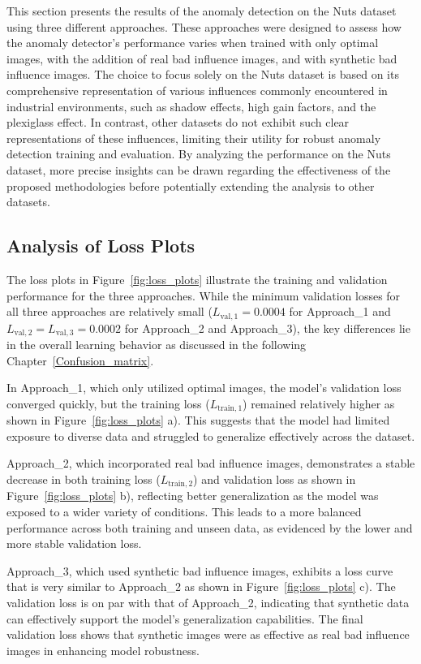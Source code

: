 \documentclass[12pt,DIV14,BCOR12mm,a4paper,footinclude=false,headinclude,parskip=half-,twoside,openright,cleardoublepage=empty,toc=index,bibliography=totoc,listof=totoc]{scrreprt}
\numberwithin{equation}{chapter}
\begin{document}
This section presents the results of the anomaly detection on the Nuts dataset using three different approaches. These approaches were designed to assess how the anomaly detector's performance varies when trained with only optimal images, with the addition of real bad influence images, and with synthetic bad influence images. The choice to focus solely on the Nuts dataset is based on its comprehensive representation of various influences commonly encountered in industrial environments, such as shadow effects, high gain factors, and the plexiglass effect. In contrast, other datasets do not exhibit such clear representations of these influences, limiting their utility for robust anomaly detection training and evaluation. By analyzing the performance on the Nuts dataset, more precise insights can be drawn regarding the effectiveness of the proposed methodologies before potentially extending the analysis to other datasets.

\subsection{Analysis of Loss Plots}

The loss plots in Figure~\ref{fig:loss_plots} illustrate the training and validation performance for the three approaches. While the minimum validation losses for all three approaches are relatively small ($L_{\text{val},1} = 0.0004$ for Approach\_1 and $L_{\text{val},2} = L_{\text{val},3} = 0.0002$ for Approach\_2 and Approach\_3), the key differences lie in the overall learning behavior as discussed in the following Chapter~\ref{Confusion_matrix}.

In Approach\_1, which only utilized optimal images, the model's validation loss converged quickly, but the training loss ($L_{\text{train},1}$) remained relatively higher as shown in Figure~\ref{fig:loss_plots} a). This suggests that the model had limited exposure to diverse data and struggled to generalize effectively across the dataset.

Approach\_2, which incorporated real bad influence images, demonstrates a stable decrease in both training loss ($L_{\text{train},2}$) and validation loss as shown in Figure~\ref{fig:loss_plots} b), reflecting better generalization as the model was exposed to a wider variety of conditions. This leads to a more balanced performance across both training and unseen data, as evidenced by the lower and more stable validation loss.

Approach\_3, which used synthetic bad influence images, exhibits a loss curve that is very similar to Approach\_2 as shown in Figure~\ref{fig:loss_plots} c). The validation loss is on par with that of Approach\_2, indicating that synthetic data can effectively support the model's generalization capabilities. The final validation loss shows that synthetic images were as effective as real bad influence images in enhancing model robustness.
\end{document}
